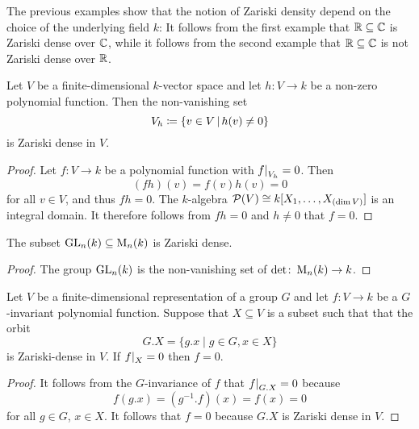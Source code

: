 \begin{warning}
  The previous examples show that the notion of Zariski density depend on the choice of the underlying field $k$:
  It follows from the first example that $\mathbb{R} \subseteq \mathbb{C}$ is Zariski dense over $\mathbb{C}$, while it follows from the second example that $\mathbb{R} \subseteq \mathbb{C}$ is not Zariski dense over $\mathbb{R}$.
\end{warning}


\begin{lemma}
  \label{lemma: non-vanishing set is dense}
  Let $V$ be a finite-dimensional $k$-vector space and let $h \colon V \to k$ be a non-zero polynomial function.
  Then the non-vanishing set
  \[
              V_h
    \defined  \{
                v \in V
              \suchthat
                h(v) \neq 0
              \}
  \]
  is Zariski dense in $V$.
\end{lemma}
\begin{proof}
  Let $f \colon V \to k$ be a polynomial function with $\restrict{f}{V_h} = 0$.
  Then
  \[
      (fh)(v)
    = f(v)h(v)
    = 0
  \]
  for all $v \in V$, and thus $fh = 0$.
  The $k$-algebra $\mathcal{P}(V) \cong k[X_1, \dotsc, X_{(\dim V)}]$ is an integral domain.
  It therefore follows from $fh = 0$ and $h \neq 0$ that $f = 0$.
\end{proof}


\begin{corollary}
  \label{corollary: GLn is Zariski dense in Mn}
  The subset $\operatorname{GL}_n(k) \subseteq \operatorname{M}_n(k)$ is Zariski dense.
\end{corollary}


\begin{proof}
  The group $\operatorname{GL}_n(k)$ is the non-vanishing set of $\det \colon \operatorname{M}_n(k) \to k$.
\end{proof}


\begin{lemma}
  \label{lemma: zariski density orbits}
  Let $V$ be a finite-dimensional representation of a group $G$ and let $f \colon V \to k$ be a $G$-invariant polynomial function.
  Suppose that $X \subseteq V$ is a subset such that that the orbit
  \[
      G.X
    = \{
        g.x
      \mid
        g \in G,
        x \in X
      \}
  \]
  is Zariski-dense in $V$.
  If $\restrict{f}{X} = 0$ then $f = 0$.
\end{lemma}


\begin{proof}
  It follows from the $G$-invariance of $f$ that $\restrict{f}{G.X} = 0$ because
  \[
      f(g.x)
    = \left( g^{-1}.f \right)(x)
    = f(x)
    = 0
  \]
  for all $g \in G$, $x \in X$.
  It follows that $f = 0$ because $G.X$ is Zariski dense in $V$.
\end{proof}


